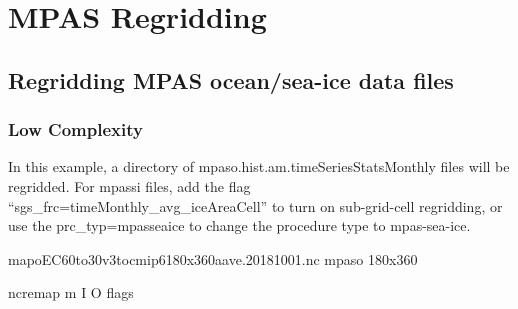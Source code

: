 \documentclass[letterpaper,10pt,english]{sphinxmanual}
\begin{document}
\chapter{MPAS Regridding}
\label{\detokenize{mpas_regrid:mpas-regridding}}\label{\detokenize{mpas_regrid:id1}}\label{\detokenize{mpas_regrid::doc}}

\section{Regridding MPAS ocean/sea-ice data files}
\label{\detokenize{mpas_regrid:regridding-mpas-ocean-sea-ice-data-files}}

\subsection{Low Complexity}
\label{\detokenize{mpas_regrid:low-complexity}}
In this example, a directory of mpaso.hist.am.timeSeriesStatsMonthly files will be regridded.
For mpassi files, add the flag “\textendash{}sgs\_frc=timeMonthly\_avg\_iceAreaCell” to turn on sub-grid-cell regridding,
or use the \textendash{}prc\_typ=mpasseaice to change the procedure type to mpas-sea-ice.

\begin{sphinxVerbatim}[commandchars=\\\{\}]
map\PYGZus{}oEC60to30v3\PYGZus{}to\PYGZus{}cmip6\PYGZus{}180x360\PYGZus{}aave.20181001.nc   
mpaso                                             
180x360                                          
                                

ncremap \PYGZhy{}m  \PYGZhy{}I  \PYGZhy{}O  flags
\end{sphinxVerbatim}
\end{document}
